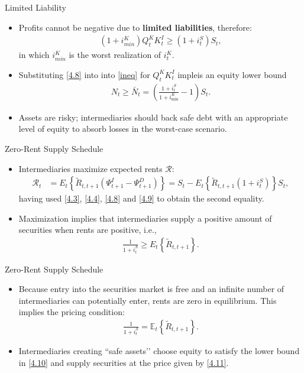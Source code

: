 \documentclass[11pt,aspectratio=169]{beamer}
\newcommand{\E}{\mathbb{E}}
\begin{document}
\begin{frame}{Limited Liability}
    \begin{itemize}
        \item Profits cannot be negative due to \textbf{limited liabilities}, therefore: 
\begin{align}
(1 + i^K_{min}) Q_t^K K_t^I \ge (1 + i_t^S) S_t,
\label{ineq}\end{align}
in which $i^K_{min}$ is the worst realization of $i^K_{t}$.
\item Substituting \eqref{4.8} into into \eqref{ineq} for $Q_t^KK_t^I$ impleis an equity lower bound 
\begin{align}
    N_t \ge \bar N_t = \left(\frac{1+i_t^S}{1+i^K_{\min}}-1\right)S_t. \label{4.10}
\end{align}
\item Assets are risky; intermediaries should back safe debt with an appropriate level of equity to absorb losses in the worst-case scenario.
    \end{itemize}
\end{frame}


\begin{frame}{Zero-Rent Supply Schedule}
\begin{itemize}

\item Intermediaries maximize expected rents $\mathcal{R}$: 
\begin{align*}
\mathcal{R}_t 
&= E_t \left\{ \tilde{R}_{t,t+1} \left( \Psi_{t+1}^I - \Psi_{t+1}^D \right) \right\}
= S_t - E_t \left\{ \tilde{R}_{t,t+1} (1 + i_t^S) \right\} S_t,
\end{align*}
having used \eqref{4.3}, \eqref{4.4}, \eqref{4.8} and \eqref{4.9} to obtain the second equality. 
\vspace{1em}
    \item Maximization implies that intermediaries supply a positive amount of securities when rents are positive, i.e., \begin{align*}
\frac{1}{1 + i_t^S} \ge E_t \left\{ \tilde{R}_{t,t+1} \right\}.
\end{align*}
\end{itemize}
\end{frame}

\begin{frame}{Zero-Rent Supply Schedule}
\small
\begin{itemize}

\item Because entry into the securities market is free and an infinite number of intermediaries can potentially enter, rents are zero in equilibrium.  
This implies the pricing condition:
\begin{align}
\frac{1}{1+i_t^S} = \E_t\!\left\{ \tilde{R}_{t,t+1} \right\}.
\label{4.11}
\end{align}

\item Intermediaries creating ``safe assets’’ choose equity to satisfy the lower bound in \eqref{4.10} and supply securities at the price given by \eqref{4.11}.
\end{itemize}
\end{frame}
\end{document}
